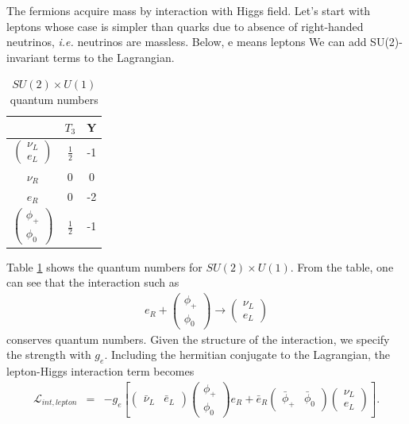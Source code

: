 The fermions acquire mass by interaction with Higgs field. 
Let's start with leptons whose case is simpler than quarks due to 
absence of right-handed neutrinos, \textit{i.e.} neutrinos are massless.
Below, e means leptons 
We can add SU(2)-invariant terms to the Lagrangian. 
\begin{table}[htb] 
\centering
\begin{tabular}{c c c  }
\hline 
      & $T_3$ & Y \\
\hline \hline 
$\left(  \begin{array}{c} \nu_L \\ e_L \end{array} \right)$      & $\displaystyle  \frac{1}{2} $ & -1 \\
$ \nu_{R}$                                                      & 0 & 0 \\
$ e_R$                                                           & 0 & -2 \\
$\left(  \begin{array}{c} \phi_+  \\ \phi_0 \end{array} \right)$      & $\displaystyle  \frac{1}{2} $ & -1 \\
\hline 
\end{tabular}
\label{tab:su2Qnum}
\caption{$SU(2) \times U(1)$ quantum numbers}
\end{table}
Table \ref{tab:su2Qnum} shows the quantum numbers for $SU(2) \times U(1)$. 
From the table, one can see that the interaction such as 
\begin{eqnarray} 
e_R + \left(  \begin{array}{c} \phi_+  \\ \phi_0 \end{array} \right) 
\rightarrow 
\left(  \begin{array}{c} \nu_L \\ e_L \end{array} \right)
\end{eqnarray} 
conserves quantum numbers. Given the structure of the interaction, 
we specify the strength with $g_e$. Including the hermitian conjugate 
to the Lagrangian, the lepton-Higgs interaction term becomes 
\begin{eqnarray} 
\mathcal{L}_{int, lepton} 
&=& 
-g_e \left[ 
\left(  \begin{array}{cc} \bar{\nu}_L & \bar{e}_L \end{array} \right)
\left(  \begin{array}{c} \phi_+  \\ \phi_0 \end{array} \right) e_R
+ 
\bar{e}_R
\left(  \begin{array}{cc} \bar{\phi}_+  & \bar{\phi}_0 \end{array} \right) 
\left(  \begin{array}{c} \nu_L \\ e_L \end{array} \right)
\right].
\end{eqnarray} 
